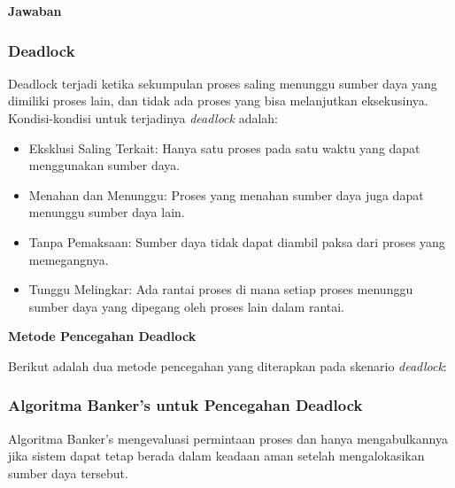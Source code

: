 \documentclass[12pt]{article}
\begin{document}
\textbf{Jawaban}
\subsubsection{Deadlock}
Deadlock terjadi ketika sekumpulan proses saling menunggu sumber daya yang dimiliki proses lain, dan tidak ada proses yang bisa melanjutkan eksekusinya. Kondisi-kondisi untuk terjadinya \textit{deadlock} adalah:
\begin{itemize}
    \item Eksklusi Saling Terkait: Hanya satu proses pada satu waktu yang dapat menggunakan sumber daya.
    \item Menahan dan Menunggu: Proses yang menahan sumber daya juga dapat menunggu sumber daya lain.
    \item Tanpa Pemaksaan: Sumber daya tidak dapat diambil paksa dari proses yang memegangnya.
    \item Tunggu Melingkar: Ada rantai proses di mana setiap proses menunggu sumber daya yang dipegang oleh proses lain dalam rantai.
\end{itemize}

\textbf{Metode Pencegahan Deadlock}

Berikut adalah dua metode pencegahan yang diterapkan pada skenario \textit{deadlock}:

\subsubsection{Algoritma Banker's untuk Pencegahan Deadlock}
Algoritma Banker's mengevaluasi permintaan proses dan hanya mengabulkannya jika sistem dapat tetap berada dalam keadaan aman setelah mengalokasikan sumber daya tersebut.
\end{document}

